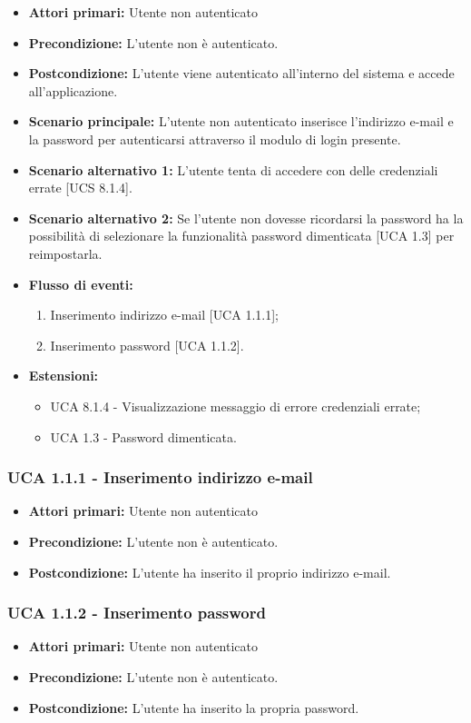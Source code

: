 \begin{itemize}
\item \textbf{Attori primari:} Utente non autenticato
\item \textbf{Precondizione:} L'utente non è autenticato.
\item \textbf{Postcondizione:} L'utente viene autenticato all'interno del sistema e accede all'applicazione.
\item \textbf{Scenario principale:} L'utente non autenticato inserisce l'indirizzo e-mail e la password per autenticarsi attraverso il modulo di login presente.
\item \textbf{Scenario alternativo 1:} L'utente tenta di accedere con delle credenziali errate [UCS 8.1.4].
\item \textbf{Scenario alternativo 2:} Se l'utente non dovesse ricordarsi la password ha la possibilità di selezionare la funzionalità password dimenticata [UCA 1.3] per reimpostarla.
\item \textbf{Flusso di eventi:}
  \begin{enumerate}
        \item Inserimento indirizzo e-mail [UCA 1.1.1];
        \item Inserimento password [UCA 1.1.2].
    \end{enumerate}
\item \textbf{Estensioni:}
	\begin{itemize}
		\item UCA 8.1.4 - Visualizzazione messaggio di errore credenziali errate;
		\item UCA 1.3 - Password dimenticata.
	\end{itemize}
\end{itemize}

\subsubsection{UCA 1.1.1 - Inserimento indirizzo e-mail}%
\begin{itemize}
\item \textbf{Attori primari:} Utente non autenticato
\item \textbf{Precondizione:} L'utente non è autenticato.
\item \textbf{Postcondizione:} L'utente ha inserito il proprio indirizzo e-mail.
\end{itemize}

\subsubsection{UCA 1.1.2 - Inserimento password}%
\begin{itemize}
\item \textbf{Attori primari:} Utente non autenticato
\item \textbf{Precondizione:} L'utente non è autenticato.
\item \textbf{Postcondizione:} L'utente ha inserito la propria password.
\end{itemize}

